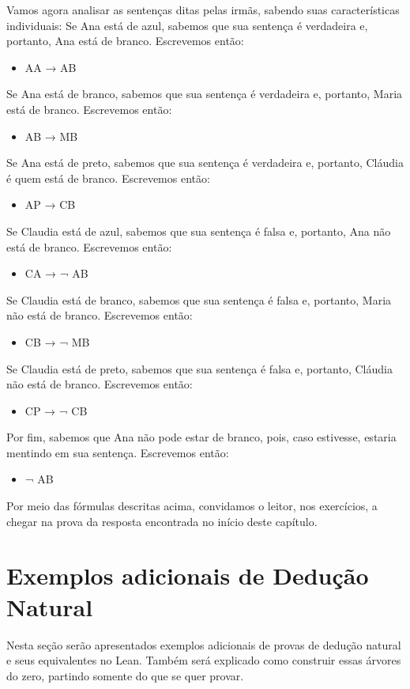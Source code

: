 Vamos agora analisar as sentenças ditas pelas irmãs, sabendo suas características individuais:
\bigbreak
Se Ana está de azul, sabemos que sua sentença é verdadeira e, portanto, Ana está de branco. Escrevemos então:
\begin{itemize}
	\item AA → AB
\end{itemize}
Se Ana está de branco, sabemos que sua sentença é verdadeira e, portanto, Maria está de branco. Escrevemos então:
\begin{itemize}
	\item AB → MB
\end{itemize}
Se Ana está de preto, sabemos que sua sentença é verdadeira e, portanto, Cláudia é quem está de branco. Escrevemos então:
\begin{itemize}
	\item AP → CB
\end{itemize}
Se Claudia está de azul, sabemos que sua sentença é falsa e, portanto, Ana não está de branco. Escrevemos então:
\begin{itemize}
	\item CA → ¬ AB
\end{itemize}
Se Claudia está de branco, sabemos que sua sentença é falsa e, portanto, Maria não está de branco. Escrevemos então:
\begin{itemize}
	\item CB → ¬ MB
\end{itemize}
Se Claudia está de preto, sabemos que sua sentença é falsa e, portanto, Cláudia não está de branco. Escrevemos então:
\begin{itemize}
	\item CP → ¬ CB
\end{itemize}
Por fim, sabemos que Ana não pode estar de branco, pois, caso estivesse, estaria mentindo em sua sentença. Escrevemos então:
\begin{itemize}
	\item ¬ AB
\end{itemize}
\bigbreak
Por meio das fórmulas descritas acima, convidamos o leitor, nos exercícios, a chegar na prova da resposta encontrada no início deste capítulo.


\section{Exemplos adicionais de Dedução Natural}

Nesta seção serão apresentados exemplos adicionais de provas de dedução natural e seus equivalentes no Lean. Também será explicado como construir essas árvores do zero, partindo somente do  que se quer provar.  

